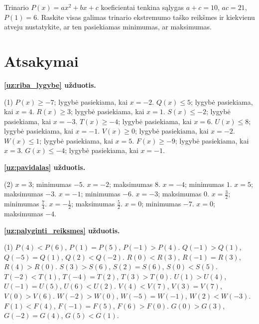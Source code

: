 \documentclass[11pt,a4paper]{scrartcl}
\makeatletter
\numberwithin{exercise}{section}
\renewenvironment{exercise}{\@thm{\th@definition}{exercise}{}}{\@endtheorem}
\makeatother
\begin{document}
\begin{exercise}\label{uz:taskas_koeficientai}
Trinario $P(x)=ax^2+bx+c$ koeficientai tenkina sąlygas $a+c=10$, $ac=21$, $P(1)=6$. Raskite visas galimas trinario ekstremumo taško reikšmes ir kiekvienu atveju nustatykite, ar ten pasiekiamas minimumas, ar maksimumas.
\end{exercise}

\newpage


\section{Atsakymai}


\medskip
\noindent\textbf{\ref{uz:riba_lygybe} užduotis.}

\begin{tasks}[label=(\arabic*),label-width=2em](1)
\task $P(x)\geq-7$; lygybė pasiekiama, kai $x=-2$.
\task $Q(x)\leq5$; lygybė pasiekiama, kai $x=4$.
\task $R(x)\geq3$; lygybė pasiekiama, kai $x=1$.
\task $S(x)\leq-2$; lygybė pasiekiama, kai $x=-3$.
\task $T(x)\geq-4$; lygybė pasiekiama, kai $x=6$.
\task $U(x)\leq8$; lygybė pasiekiama, kai $x=-1$.
\task $V(x)\geq0$; lygybė pasiekiama, kai $x=-2$.
\task $W(x)\leq1$; lygybė pasiekiama, kai $x=5$.
\task $F(x)\geq-9$; lygybė pasiekiama, kai $x=3$.
\task $G(x)\leq-4$; lygybė pasiekiama, kai $x=-1$.
\end{tasks}

\medskip
\noindent\textbf{\ref{uz:pavidalas} užduotis.}

\begin{tasks}[label=(\arabic*),label-width=2em](2)
\task $x=3$; minimumas $-5$.
\task $x=-2$; maksimumas $8$.
\task $x=-4$; minimumas $1$.
\task $x=5$; maksimumas $-3$.
\task $x=-1$; minimumas $-6$.
\task $x=-3$; maksimumas $0$.
\task $x=\frac32$; minimumas $\frac74$.
\task $x=-\frac12$; maksimumas $\frac52$.
\task $x=0$; minimumas $-7$.
\task $x=0$; maksimumas $-4$.
\end{tasks}

\medskip
\noindent\textbf{\ref{uz:palyginti_reiksmes} užduotis.}

\begin{tasks}[label=(\arabic*),label-width=2em](1)
\task $P(4)<P(6)$, $P(1)=P(5)$, $P(-1)>P(4)$.
\task $Q(-1)>Q(1)$, $Q(-5)=Q(1)$, $Q(2)<Q(-2)$.
\task $R(0)<R(3)$, $R(-1)=R(3)$, $R(4)>R(0)$.
\task $S(3)>S(6)$, $S(2)=S(6)$, $S(0)<S(5)$.
\task $T(-2)<T(1)$, $T(-4)=T(2)$, $T(3)>T(0)$.
\task $U(1)>U(4)$, $U(-1)=U(5)$, $U(6)<U(2)$.
\task $V(4)<V(7)$, $V(3)=V(7)$, $V(0)>V(6)$.
\task $W(-2)>W(0)$, $W(-5)=W(-1)$, $W(2)<W(-3)$.
\task $F(1)<F(4)$, $F(-1)=F(5)$, $F(6)>F(0)$.
\task $G(0)>G(3)$, $G(-2)=G(4)$, $G(5)<G(1)$.
\end{tasks}
\end{document}
